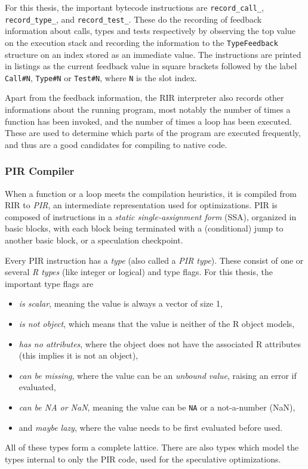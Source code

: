 For this thesis, the important bytecode instructions are \texttt{record\_call\_}, \texttt{record\_type\_}, and \texttt{record\_test\_}. These do the recording of feedback information about calls, types and tests respectively by observing the top value on the execution stack and recording the information to the \texttt{TypeFeedback} structure on an index stored as an immediate value. The instructions are printed in listings as the current feedback value in square brackets followed by the label \texttt{Call\#N}, \texttt{Type\#N} or \texttt{Test\#N}, where \texttt{N} is the slot index.

Apart from the feedback information, the RIR interpreter also records other informations about the running program, most notably the number of times a function has been invoked, and the number of times a loop has been executed. These are used to determine which parts of the program are executed frequently, and thus are a good candidates for compiling to native code.

\subsubsection*{PIR Compiler}

When a function or a loop meets the compilation heuristics, it is compiled from RIR to \textit{PIR}, an intermediate representation used for optimizations. PIR is composed of instructions in a \textit{static single-assignment form} (SSA), organized in basic blocks, with each block being terminated with a (conditional) jump to another basic block, or a speculation checkpoint.

Every PIR instruction has a \textit{type} (also called a \textit{PIR type}). These consist of one or several \textit{R types} (like integer or logical) and type flags. For this thesis, the important type flags are
\begin{itemize}
	\item{} \textit{is scalar}, meaning the value is always a vector of size 1,
	\item{} \textit{is not object}, which means that the value is neither of the R object models,
	\item{} \textit{has no attributes}, where the object does not have the associated R attributes (this implies it is not an object),
	\item{} \textit{can be missing}, where the value can be an \textit{unbound value}, raising an error if evaluated,
	\item{} \textit{can be NA or NaN}, meaning the value can be \texttt{NA} or a not-a-number (NaN),
	\item{} and \textit{maybe lazy}, where the value needs to be first evaluated before used.
\end{itemize}
All of these types form a complete lattice. There are also types which model the types internal to only the PIR code, used for the speculative optimizations.

